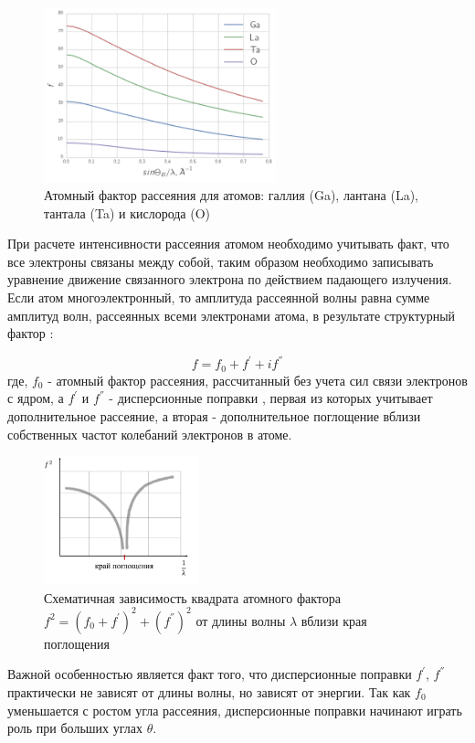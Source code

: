 \begin{figure}[H]
  \centering
  \includegraphics[width=0.6\textwidth]{images/atom_factor_GaLaTa.png}
  \caption{ Атомный фактор рассеяния для атомов: галлия (Ga), лантана (La), тантала (Ta) и  кислорода (O)}
  \label{ris:atom_factor_GaLaTa}
\end{figure}

При расчете интенсивности рассеяния атомом необходимо учитывать факт,
что все электроны связаны между собой, таким образом необходимо записывать
уравнение движение связанного электрона по действием падающего излучения.
Если атом многоэлектронный, то амплитуда рассеянной волны равна сумме амплитуд волн,
рассеянных всеми электронами атома, в результате структурный фактор \cite{iveronova1972}:

\begin{equation}
  f = f_0 + f^{'} + i f^{''}
 \end{equation}
\noindent
где, $f_0$ - атомный фактор рассеяния, рассчитанный без учета сил связи электронов
 с ядром, а $f^{'}$ и $f^{''}$ - дисперсионные поправки \cite{f0f1f12},
 первая из которых учитывает дополнительное рассеяние,
а вторая - дополнительное поглощение вблизи собственных частот колебаний электронов в атоме.

 \begin{figure}[H]
   \centering
   \includegraphics[width=0.4\textwidth]{images/dispers_f.png}
   \caption{ Схематичная зависимость квадрата атомного фактора $f^2 = (f_0 + f^{'})^2 + (f^{''})^2 $ от
   длины волны $\lambda$ вблизи края поглощения}
   \label{ris:dispers_f}
 \end{figure}

Важной особенностью является факт того, что дисперсионные поправки $f^{'}$, $f^{''}$
практически не зависят от длины волны, но зависят от энергии. Так как $f_0$ уменьшается
с ростом угла рассеяния, дисперсионные поправки начинают играть роль при больших углах $\theta$.
